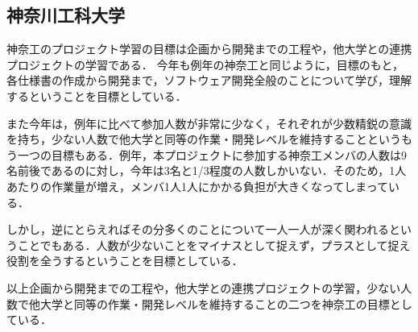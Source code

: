 \subsection{神奈川工科大学}
\par
神奈工のプロジェクト学習の目標は企画から開発までの工程や，他大学との連携プロジェクトの学習である．
今年も例年の神奈工と同じように，目標のもと，各仕様書の作成から開発まで，ソフトウェア開発全般のことについて学び，理解するということを目標としている．
\par
また今年は，例年に比べて参加人数が非常に少なく，それぞれが少数精鋭の意識を持ち，少ない人数で他大学と同等の作業・開発レベルを維持することというもう一つの目標もある．例年，本プロジェクトに参加する神奈工メンバの人数は9名前後であるのに対し，今年は3名と1/3程度の人数しかいない．そのため，1人あたりの作業量が増え，メンバ1人1人にかかる負担が大きくなってしまっている．
\par
しかし，逆にとらえればその分多くのことについて一人一人が深く関われるということでもある．人数が少ないことをマイナスとして捉えず，プラスとして捉え役割を全うするということを目標としている．
\par
以上企画から開発までの工程や，他大学との連携プロジェクトの学習，少ない人数で他大学と同等の作業・開発レベルを維持することの二つを神奈工の目標としている．
